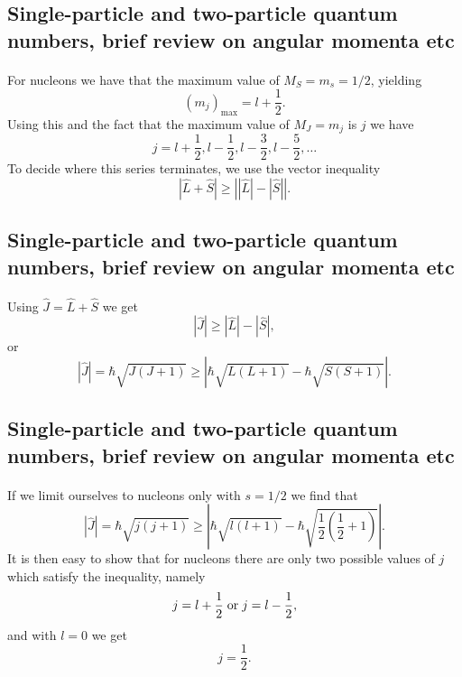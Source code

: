 \documentclass[%
twoside,                 %
final,                   %
10pt]{article}
\begin{document}
\subsection*{Single-particle and two-particle quantum numbers, brief review on angular momenta etc}

\paragraph{}
For nucleons we have that the maximum value of $M_S=m_s=1/2$, yielding
\[
   (m_j)_{\mathrm{max}}=l+\frac{1}{2}.
\]
Using this and the fact that the maximum value of  $M_J=m_j$ is $j$ we have
\[
   j=l+\frac{1}{2}, l-\frac{1}{2}, l-\frac{3}{2}, l-\frac{5}{2}, \dots 
\]
To decide where this series terminates, we use the vector inequality
\[
   |\hat{L}+\hat{S}| \ge \left| |\hat{L}|-|\hat{S}|\right|.
\]




\subsection*{Single-particle and two-particle quantum numbers, brief review on angular momenta etc}

\paragraph{}
Using $\hat{J}=\hat{L}+\hat{S}$ we get 
\[
   |\hat{J}| \ge |\hat{L}|-|\hat{S}|,
\]
or
\[
   |\hat{J}|=\hbar\sqrt{J(J+1)}\ge |\hbar\sqrt{L(L+1)}-
   \hbar\sqrt{S(S+1)}|.
\]





\subsection*{Single-particle and two-particle quantum numbers, brief review on angular momenta etc}

\paragraph{}
If we limit ourselves to nucleons only with $s=1/2$ we find that
\[
   |\hat{J}|=\hbar\sqrt{j(j+1)}\ge |\hbar\sqrt{l(l+1)}-
   \hbar\sqrt{\frac{1}{2}(\frac{1}{2}+1)}|.
\]
It is then easy to show that for nucleons there are only two possible values of
$j$ which satisfy the inequality, namely
\[
   j=l+\frac{1}{2}\hspace{0.1cm} \mathrm{or} \hspace{0.1cm}j=l-\frac{1}{2},
\]
and with $l=0$ we get 
\[
   j=\frac{1}{2}.
\]
\end{document}
